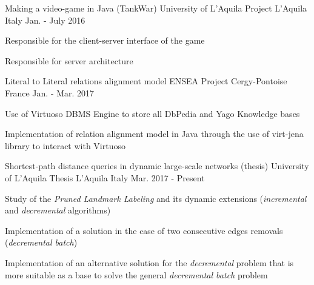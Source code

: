 \begin{cventries}
\cventry
{Making a video-game in Java (TankWar)} %
{University of L'Aquila Project} %
{L'Aquila Italy} %
{Jan. - July 2016} %
{ %
	\begin{cvitems}
		\item {Responsible for the client-server interface of the game}
		\item {Responsible for server architecture}
	\end{cvitems}
}

\cventry
{Literal to Literal relations alignment model} %
{ENSEA Project} %
{Cergy-Pontoise France} %
{Jan. - Mar. 2017} %
{ %
	\begin{cvitems}
		\item {Use of Virtuoso DBMS Engine to store all DbPedia and Yago Knowledge bases}
		\item {Implementation of relation alignment model in Java through the use of virt-jena library to interact with Virtuoso}
	\end{cvitems}
}

\cventry
{Shortest-path distance queries in dynamic large-scale networks (thesis)} %
{University of L'Aquila Thesis} %
{L'Aquila Italy} %
{Mar. 2017 - Present} %
{ %
	\begin{cvitems}
		\item {Study of the \textit{Pruned Landmark Labeling} and its dynamic extensions (\textit{incremental} and \textit{decremental} algorithms)}
		\item {Implementation of a solution in the case of two consecutive edges removals (\textit{decremental batch})}
		\item {Implementation of an alternative solution for the \textit{decremental} problem that is more suitable as a base to solve the general \textit{decremental batch} problem}
	\end{cvitems}
}

\end{cventries}